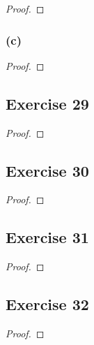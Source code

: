 \documentclass[14pt]{extarticle}
\begin{document}
\begin{proof}

\end{proof}

\subsubsection{(c)}

\begin{proof}

\end{proof}

\subsection{Exercise 29}

\begin{proof}

\end{proof}

\subsection{Exercise 30}

\begin{proof}

\end{proof}

\subsection{Exercise 31}

\begin{proof}

\end{proof}

\subsection{Exercise 32}

\begin{proof}

\end{proof}
\end{document}
